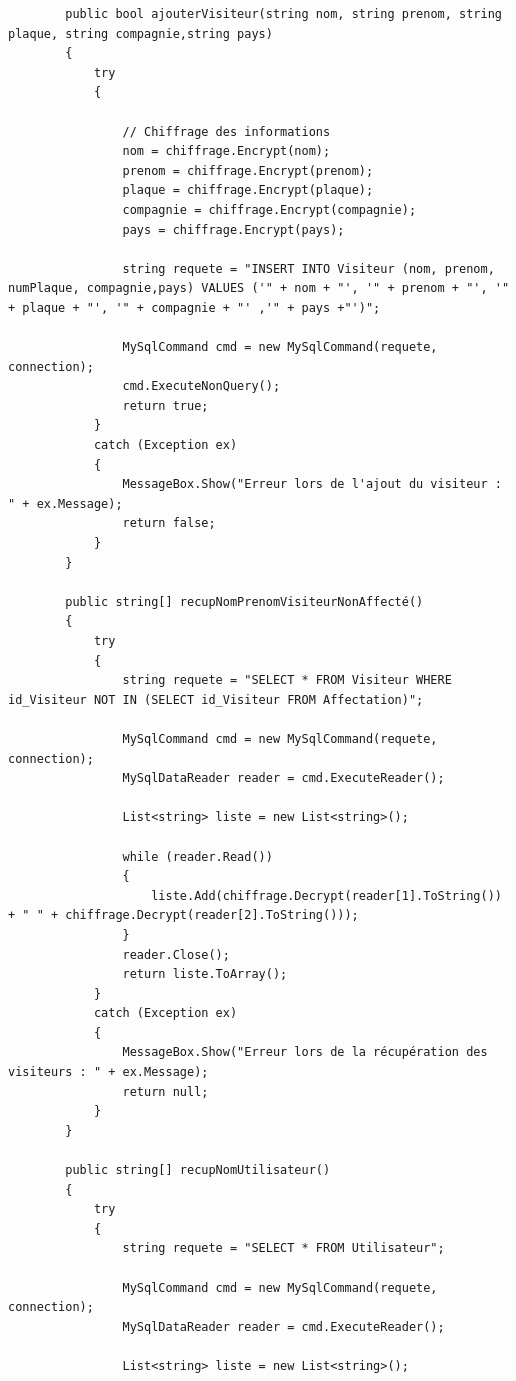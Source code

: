\documentclass[main.tex]{subfiles}
\begin{document}
\begin{lstlisting}
        public bool ajouterVisiteur(string nom, string prenom, string plaque, string compagnie,string pays)
        {
            try
            {

                // Chiffrage des informations
                nom = chiffrage.Encrypt(nom);
                prenom = chiffrage.Encrypt(prenom);
                plaque = chiffrage.Encrypt(plaque);
                compagnie = chiffrage.Encrypt(compagnie);
                pays = chiffrage.Encrypt(pays);

                string requete = "INSERT INTO Visiteur (nom, prenom, numPlaque, compagnie,pays) VALUES ('" + nom + "', '" + prenom + "', '" + plaque + "', '" + compagnie + "' ,'" + pays +"')";

                MySqlCommand cmd = new MySqlCommand(requete, connection);
                cmd.ExecuteNonQuery();
                return true;
            }
            catch (Exception ex)
            {
                MessageBox.Show("Erreur lors de l'ajout du visiteur : " + ex.Message);
                return false;
            }
        }

        public string[] recupNomPrenomVisiteurNonAffecté()
        {
            try
            {
                string requete = "SELECT * FROM Visiteur WHERE id_Visiteur NOT IN (SELECT id_Visiteur FROM Affectation)";

                MySqlCommand cmd = new MySqlCommand(requete, connection);
                MySqlDataReader reader = cmd.ExecuteReader();

                List<string> liste = new List<string>();

                while (reader.Read())
                {
                    liste.Add(chiffrage.Decrypt(reader[1].ToString()) + " " + chiffrage.Decrypt(reader[2].ToString()));
                }
                reader.Close();
                return liste.ToArray();
            }
            catch (Exception ex)
            {
                MessageBox.Show("Erreur lors de la récupération des visiteurs : " + ex.Message);
                return null;
            }
        }

        public string[] recupNomUtilisateur()
        {
            try
            {
                string requete = "SELECT * FROM Utilisateur";

                MySqlCommand cmd = new MySqlCommand(requete, connection);
                MySqlDataReader reader = cmd.ExecuteReader();

                List<string> liste = new List<string>();


\end{lstlisting}
\end{document}
